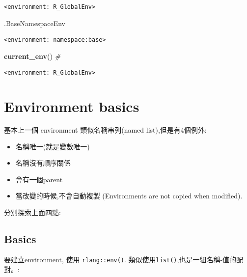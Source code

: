 \documentclass[]{book}
\newenvironment{Shaded}{\begin{snugshade}}{\end{snugshade}}
\newcommand{\CommentTok}[1]{\textcolor[rgb]{0.56,0.35,0.01}{\textit{#1}}}
\newcommand{\KeywordTok}[1]{\textcolor[rgb]{0.13,0.29,0.53}{\textbf{#1}}}
\newcommand{\NormalTok}[1]{#1}
\providecommand{\tightlist}{%
  \setlength{\itemsep}{0pt}\setlength{\parskip}{0pt}}
\theoremstyle{definition}
\theoremstyle{definition}
\theoremstyle{definition}
\theoremstyle{remark}
\begin{document}
\begin{verbatim}
<environment: R_GlobalEnv>
\end{verbatim}

\begin{Shaded}
\begin{Highlighting}[]
\NormalTok{.BaseNamespaceEnv}
\end{Highlighting}
\end{Shaded}

\begin{verbatim}
<environment: namespace:base>
\end{verbatim}

\begin{Shaded}
\begin{Highlighting}[]
\KeywordTok{current_env}\NormalTok{() }\CommentTok{#}
\end{Highlighting}
\end{Shaded}

\begin{verbatim}
<environment: R_GlobalEnv>
\end{verbatim}

\hypertarget{env-basics}{%
\section{Environment basics}\label{env-basics}}

基本上一個 environment 類似名稱串列(named list),但是有4個例外:

\begin{itemize}
\tightlist
\item
  名稱唯一(就是變數唯一)\\
\item
  名稱沒有順序關係\\
\item
  會有一個parent\\
\item
  當改變的時候,不會自動複製 (Environments are not copied when modified).
\end{itemize}

分別探索上面四點:

\hypertarget{basics}{%
\subsection{Basics}\label{basics}}

要建立environment, 使用 \texttt{rlang::env()}.
類似使用\texttt{list()},也是一組名稱-值的配對。:
\end{document}
